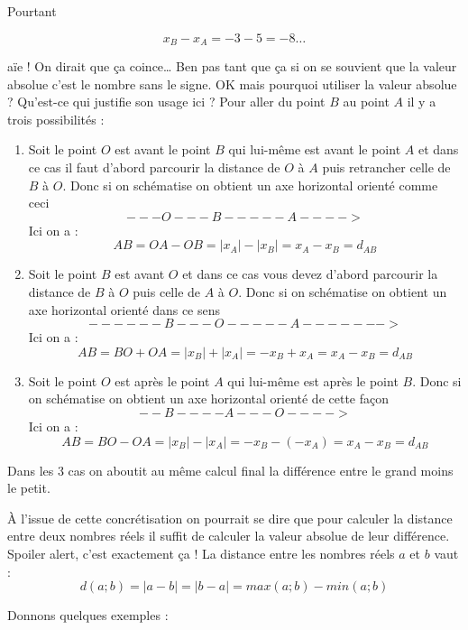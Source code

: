 \documentclass[a4paper,11pt]{book}
\begin{document}
Pourtant

\[x_B - x_A = -3 - 5 = -8\dots\]

aïe ! On dirait que ça coince\ldots{}
Ben pas tant que ça si on se souvient que la valeur
absolue c'est le nombre sans le signe. OK mais
pourquoi utiliser la valeur absolue ? Qu'est-ce qui justifie son usage
ici ? Pour aller du point \(B\) au point \(A\) il y a trois
possibilités :


\begin{enumerate}
\item Soit le point \(O\) est avant le point \(B\) qui lui-même est avant
le point \(A\) et dans ce cas il faut d'abord parcourir la distance
de \(O\) à \(A\) puis retrancher celle de \(B\) à \(O\). Donc si on
schématise on obtient un axe horizontal orienté comme ceci
\[---O---B-----A---->\]
Ici on a : \[AB = OA - OB = |x_A| - |x_B| = x_A - x_B = d_{AB}\]
\item Soit le point \(B\) est avant \(O\) et dans ce cas vous devez
d'abord parcourir la distance de \(B\) à \(O\) puis celle de \(A\)
à \(O\). Donc si on schématise on obtient un axe horizontal orienté
dans ce sens \[------B---O-----A------->\]
Ici on a : \[AB = BO + OA = \lvert x_B \rvert + \lvert x_A \rvert =
   -x_B + x_A = x_A - x_B = d_{AB}\]
\item Soit le point \(O\) est après le point \(A\) qui lui-même est après
le point \(B\). Donc si on schématise on obtient un axe horizontal
orienté de cette façon \[--B----A---O---->\]
Ici on a : \[AB = BO - OA = |x_B| - |x_A| = -x_B - (-x_A) = x_A - x_B
   = d_{AB}\]
\end{enumerate}


Dans les 3 cas on aboutit au même calcul final la différence entre
le grand moins le petit.

À l'issue de cette concrétisation on pourrait se dire que pour
calculer la distance entre deux nombres réels il
suffit de calculer la valeur absolue de leur
différence. Spoiler alert, c'est exactement ça ! La distance entre les
nombres réels \(a\) et \(b\) vaut :
\[d(a; b) = \lvert a - b \rvert = \lvert b - a \rvert = max(a ;
   b) - min(a ; b)\]


Donnons quelques exemples :
\end{document}
